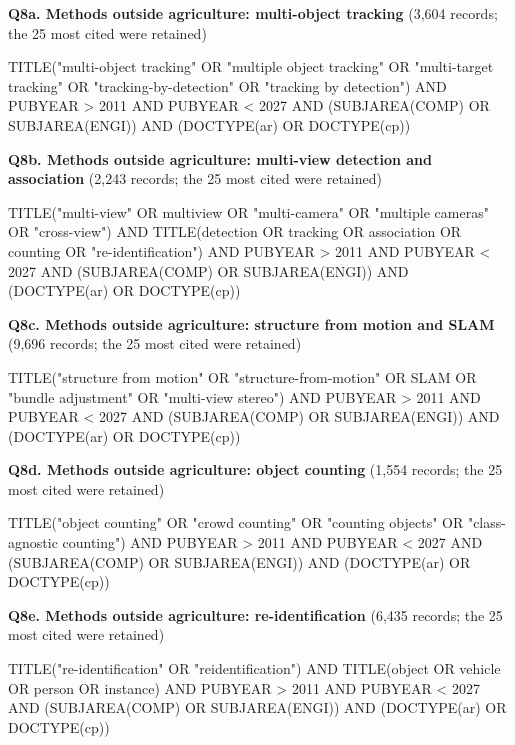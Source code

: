 \par\medskip\noindent\textbf{Q8a. Methods outside agriculture: multi-object tracking} (3,604 records; the 25 most cited were retained)\par\nobreak\smallskip
{\noindent\scriptsize\ttfamily\raggedright TITLE("multi-object tracking" OR "multiple object tracking" OR "multi-target tracking" OR "tracking-by-detection" OR "tracking by detection") AND PUBYEAR > 2011 AND PUBYEAR < 2027 AND (SUBJAREA(COMP) OR SUBJAREA(ENGI)) AND (DOCTYPE(ar) OR DOCTYPE(cp))\par}
\par\medskip\noindent\textbf{Q8b. Methods outside agriculture: multi-view detection and association} (2,243 records; the 25 most cited were retained)\par\nobreak\smallskip
{\noindent\scriptsize\ttfamily\raggedright TITLE("multi-view" OR multiview OR "multi-camera" OR "multiple cameras" OR "cross-view") AND TITLE(detection OR tracking OR association OR counting OR "re-identification") AND PUBYEAR > 2011 AND PUBYEAR < 2027 AND (SUBJAREA(COMP) OR SUBJAREA(ENGI)) AND (DOCTYPE(ar) OR DOCTYPE(cp))\par}
\par\medskip\noindent\textbf{Q8c. Methods outside agriculture: structure from motion and SLAM} (9,696 records; the 25 most cited were retained)\par\nobreak\smallskip
{\noindent\scriptsize\ttfamily\raggedright TITLE("structure from motion" OR "structure-from-motion" OR SLAM OR "bundle adjustment" OR "multi-view stereo") AND PUBYEAR > 2011 AND PUBYEAR < 2027 AND (SUBJAREA(COMP) OR SUBJAREA(ENGI)) AND (DOCTYPE(ar) OR DOCTYPE(cp))\par}
\par\medskip\noindent\textbf{Q8d. Methods outside agriculture: object counting} (1,554 records; the 25 most cited were retained)\par\nobreak\smallskip
{\noindent\scriptsize\ttfamily\raggedright TITLE("object counting" OR "crowd counting" OR "counting objects" OR "class-agnostic counting") AND PUBYEAR > 2011 AND PUBYEAR < 2027 AND (SUBJAREA(COMP) OR SUBJAREA(ENGI)) AND (DOCTYPE(ar) OR DOCTYPE(cp))\par}
\par\medskip\noindent\textbf{Q8e. Methods outside agriculture: re-identification} (6,435 records; the 25 most cited were retained)\par\nobreak\smallskip
{\noindent\scriptsize\ttfamily\raggedright TITLE("re-identification" OR "reidentification") AND TITLE(object OR vehicle OR person OR instance) AND PUBYEAR > 2011 AND PUBYEAR < 2027 AND (SUBJAREA(COMP) OR SUBJAREA(ENGI)) AND (DOCTYPE(ar) OR DOCTYPE(cp))\par}
